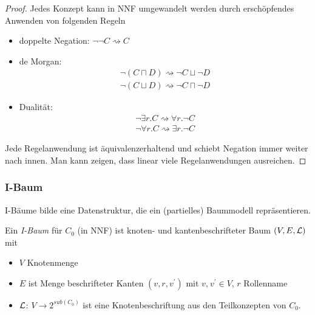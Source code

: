 \begin{tafel}

    \begin{proof}
        Jedes Konzept kann in NNF umgewandelt werden durch erschöpfendes Anwenden von folgenden Regeln
        \begin{itemize}
            \item doppelte Negation: $\neg \neg C \rightsquigarrow C$
            \item de Morgan: \begin{align*}
                    \neg (C \sqcap D) \rightsquigarrow \neg C \sqcup \neg D\\
                    \neg (C \sqcup D) \rightsquigarrow \neg C \sqcap \neg D
                \end{align*}
            \item Dualität: \begin{align*}
                    \neg \exists r.C \rightsquigarrow \forall r.\neg C\\
                    \neg \forall r.C \rightsquigarrow \exists r.\neg C
                \end{align*}
        \end{itemize}
        Jede Regelanwendung ist äquivalenzerhaltend und schiebt Negation immer
        weiter nach innen. Man kann zeigen, dass linear viele Regelanwendungen
        ausreichen.
    \end{proof}
\end{tafel}


\subsubsection{I-Baum}\label{i-baum}

I-Bäume bilde eine Datenstruktur, die ein (partielles) Baummodell
repräsentieren.

\begin{definition}[I-Baum]

Ein \emph{I-Baum} für $C_{0}$ (in NNF) ist knoten- und kantenbeschrifteter
Baum $\left( V,E,\ML \right)$ mit

\begin{itemize}
\item $V$ Knotenmenge
\item $E$ ist Menge beschrifteter Kanten $\left( v,r,v^{'} \right)$ mit
  $v$,$\ v^{'} \in V$, $r$ Rollenname
\item $\mathcal{L}$: $V \rightarrow 2^{sub(C_{0})}$ ist eine Knotenbeschriftung aus den Teilkonzepten von $C_0$.
\end{itemize}
\end{definition}

